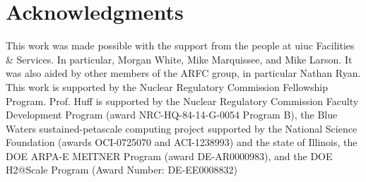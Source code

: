 \section{Acknowledgments}
This work was made possible with the support from the people at \gls{uiuc}
Facilities \& Services. In particular, Morgan White, Mike Marquissee, and Mike
Larson. It was also aided by other members of the \gls{ARFC} group, in
particular Nathan Ryan.
This work is supported by the Nuclear Regulatory Commission Fellowship Program.
Prof. Huff is supported by the Nuclear Regulatory Commission Faculty
Development Program (award NRC-HQ-84-14-G-0054 Program B), the Blue Waters
sustained-petascale computing project supported by the National Science
Foundation (awards OCI-0725070 and ACI-1238993) and the state of Illinois, the
DOE ARPA-E MEITNER Program (award DE-AR0000983), and the DOE H2@Scale Program
(Award Number: DE-EE0008832)
